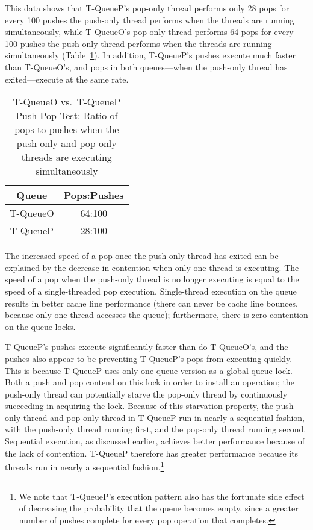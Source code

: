 This data shows that T-QueueP's pop-only thread performs only 28 pops for every 100 pushes the push-only thread performs when the threads are running simultaneously, while T-QueueO's pop-only thread performs 64 pops for every 100 pushes the push-only thread performs when the threads are running simultaneously (Table~\ref{tab:sto_pop_push_ratio}). In addition, T-QueueP's pushes execute much faster than T-QueueO's, and pops in both queues---when the push-only thread has exited---execute at the same rate.

\begin{table}[t]
        \centering
    \begin{tabular}{|cc|}
        \hline
        Queue & Pops:Pushes\\
        \hline
            T-QueueO & 64:100\\
            T-QueueP & 28:100\\
        \hline
    \end{tabular}
    \caption{T-QueueO vs.\ T-QueueP Push-Pop Test: Ratio of pops to pushes when the push-only and pop-only threads are executing simultaneously}
    \label{tab:sto_pop_push_ratio}
\end{table}

The increased speed of a pop once the push-only thread has exited can be explained by the decrease in contention when only one thread is executing. The speed of a pop when the push-only thread is no longer executing is equal to the speed of a single-threaded pop execution. Single-thread execution on the queue results in better cache line performance (there can never be cache line bounces, because only one thread accesses the queue); furthermore, there is zero contention on the queue locks. 

T-QueueP's pushes execute significantly faster than do T-QueueO's, and the pushes also appear to be preventing T-QueueP's pops from executing quickly. This is because T-QueueP uses only one queue version as a global queue lock. Both a push and pop contend on this lock in order to install an operation; the push-only thread can potentially starve the pop-only thread by continuously succeeding in acquiring the lock.
Because of this starvation property, the push-only thread and pop-only thread in T-QueueP run in nearly a sequential fashion, with the push-only thread running first, and the pop-only thread running second.
Sequential execution, as discussed earlier, achieves better performance because of the lack of contention.
T-QueueP therefore has greater performance because its threads run in nearly a sequential fashion.\footnote{We note that T-QueueP's execution pattern also has the fortunate side effect of decreasing the probability that the queue becomes empty, since a greater number of pushes complete for every pop operation that completes.}

